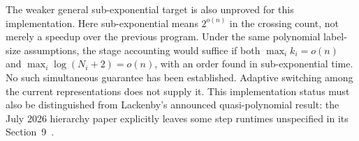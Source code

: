 The weaker general sub-exponential target is also unproved for this
implementation.  Here sub-exponential means $2^{o(n)}$ in the crossing
count, not merely a speedup over the previous program.  Under the same
polynomial label-size assumptions, the stage accounting would suffice
if both $\max_i k_i=o(n)$ and $\max_i\log(N_i+2)=o(n)$, with an order
found in sub-exponential time.  No such simultaneous guarantee has been
established.  Adaptive switching among the current representations does
not supply it.  This implementation status must also be distinguished
from Lackenby's announced quasi-polynomial result: the July 2026 hierarchy
paper explicitly leaves some step runtimes unspecified in its
Section~9~\cite{lackenby2026}.
